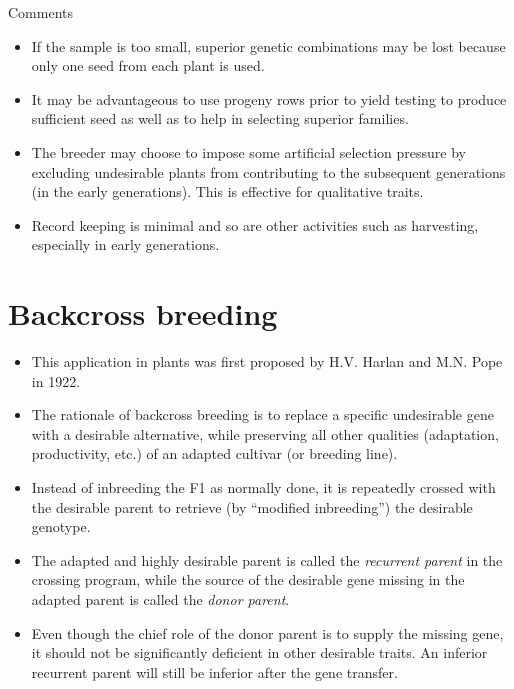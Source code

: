 \documentclass[11pt,ignorenonframetext,aspectratio=169]{beamer}
\providecommand{\tightlist}{%
  \setlength{\itemsep}{0pt}\setlength{\parskip}{0pt}}
\begin{document}
\begin{frame}{Comments}
\protect\hypertarget{comments}{}
\begin{itemize}
\tightlist
\item
  If the sample is too small, superior genetic combinations may be lost
  because only one seed from each plant is used.
\item
  It may be advantageous to use progeny rows prior to yield testing to
  produce sufficient seed as well as to help in selecting superior
  families.
\item
  The breeder may choose to impose some artificial selection pressure by
  excluding undesirable plants from contributing to the subsequent
  generations (in the early generations). This is effective for
  qualitative traits.
\item
  Record keeping is minimal and so are other activities such as
  harvesting, especially in early generations.
\end{itemize}
\end{frame}

\hypertarget{backcross-breeding}{%
\section{Backcross breeding}\label{backcross-breeding}}

\begin{frame}{}
\protect\hypertarget{section-16}{}
\begin{itemize}
\tightlist
\item
  This application in plants was first proposed by H.V. Harlan and M.N.
  Pope in 1922.
\item
  The rationale of backcross breeding is to replace a specific
  undesirable gene with a desirable alternative, while preserving all
  other qualities (adaptation, productivity, etc.) of an adapted
  cultivar (or breeding line).
\item
  Instead of inbreeding the F1 as normally done, it is repeatedly
  crossed with the desirable parent to retrieve (by ``modified
  inbreeding'') the desirable genotype.
\item
  The adapted and highly desirable parent is called the \emph{recurrent
  parent} in the crossing program, while the source of the desirable
  gene missing in the adapted parent is called the \emph{donor parent}.
\item
  Even though the chief role of the donor parent is to supply the
  missing gene, it should not be significantly deficient in other
  desirable traits. An inferior recurrent parent will still be inferior
  after the gene transfer.
\end{itemize}
\end{frame}
\end{document}

